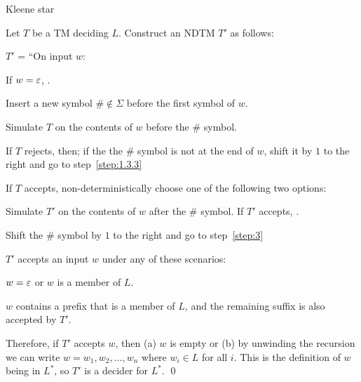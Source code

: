 \begin{problem}
\begin{enumalph}
    \setcounter{enumi}{4}
    \item Kleene star
    \begin{Answer}
      Let $T$ be a TM deciding $L$.  Construct an NDTM $T'$ as follows:

      \step
      $T'$ = ``On input $w$:
        \begin{enumarabic}
          \item If $w = \varepsilon$, \Accept.
          \item Insert a new symbol $\# \notin \Sigma$ before the first
                symbol of $w$.
          \item Simulate $T$ on the contents of $w$ before the $\#$ symbol.~\label{step:1.3.3}
          \item If $T$ rejects, then; if the the $\#$ symbol is not at the end
            of $w$, shift it by $1$ to the right and go to step~\ref{step:1.3.3}
          \item If $T$ accepts, non-deterministically choose one of the following
            two options:
            \begin{enumarabic*}
              \item Simulate $T'$ on the contents of $w$ after the $\#$ symbol.
                If $T'$ accepts, \Accept.
              \item Shift the $\#$ symbol by $1$ to the right and go to step~\ref{step:3}
            \end{enumarabic*}
        \end{enumarabic}

      \step
      $T'$ accepts an input $w$ under any of these scenarios:
      \begin{enumroman}
        \item $w = \varepsilon$ or $w$ is a member of $L$.
        \item $w$ contains a prefix that is a member of $L$,
          and the remaining suffix is also accepted by $T'$.
      \end{enumroman}

      \step
      Therefore, if $T'$ accepts $w$, then (a) $w$ is empty or
      (b) by unwinding the recursion we can write
      $w = w_1, w_2, \ldots, w_n$ where $w_i \in L$ for all $i$.
      This is the definition of $w$ being in $L^*$, so $T'$ is a decider
      for $L^*$.  \qed
    \end{Answer}
  \end{enumalph}
\end{problem}
